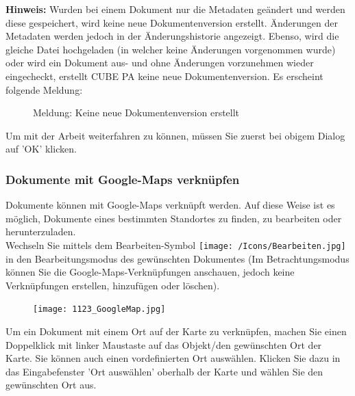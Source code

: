 \textbf{Hinweis:} Wurden bei einem Dokument nur die Metadaten geändert und werden diese gespeichert, wird keine neue Dokumentenversion erstellt. Änderungen der Metadaten werden jedoch in der Änderungshistorie angezeigt. Ebenso, wird die gleiche Datei hochgeladen (in welcher keine Änderungen vorgenommen wurde) oder wird ein Dokument aus- und ohne Änderungen vorzunehmen wieder eingecheckt, erstellt CUBE PA keine neue Dokumentenversion. Es erscheint folgende Meldung:

\begin{figure}[H]
\caption{Meldung: Keine neue Dokumentenversion erstellt}
\end{figure}

Um mit der Arbeit weiterfahren zu können, müssen Sie zuerst bei obigem Dialog auf 'OK' klicken.

\subsubsection{Dokumente mit Google-Maps verknüpfen}
\label{bkm:Ref442545553}
Dokumente können mit Google-Maps verknüpft werden. Auf diese Weise ist es möglich, Dokumente eines bestimmten Standortes zu finden, zu bearbeiten oder herunterzuladen. \\
Wechseln Sie mittels dem Bearbeiten-Symbol \texttt{[image: /Icons/Bearbeiten.jpg]} in den Bearbeitungsmodus des gewünschten Dokumentes (Im Betrachtungsmodus können Sie die Google-Maps-Verknüpfungen anschauen, jedoch keine Verknüpfungen erstellen, hinzufügen oder löschen).

\vspace{2mm}

\begin{figure}
\vspace{-15pt}
\texttt{[image: 1123\_GoogleMap.jpg]}
\end{figure}

Um ein Dokument mit einem Ort auf der Karte zu verknüpfen, machen Sie einen Doppelklick mit linker Maustaste auf das Objekt/den gewünschten Ort der Karte. Sie können auch einen vordefinierten Ort auswählen. Klicken Sie dazu in das Eingabefenster 'Ort auswählen' oberhalb der Karte und wählen Sie den gewünschten Ort aus.

